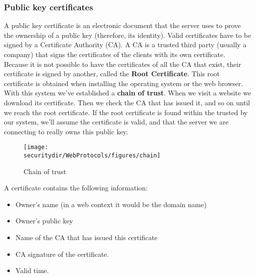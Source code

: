 \subsubsection{Public key certificates}
A public key certificate is an electronic document that the server uses to prove the ownership of a public key (therefore, its identity). Valid certificates have to be signed by a Certificate Authority (CA). A CA is a trusted third party (usually a company) that signs the certificates of the clients with its own certificate. Because it is not possible to have the certificates of all the CA that exist, their certificate is signed by another, called the \textbf{Root Certificate}. This root certificate is obtained when installing the operating system or the web browser. With this system we've established a \textbf{chain of trust}. When we visit a website we download its certificate. Then we check the CA that has issued it, and so on until we reach the root certificate. If the root certificate is found within the trusted by our system, we'll assume the certificate is valid, and that the server we are connecting to really owns this public key. 

\begin{figure}[htb]
	\begin{centering}
		\texttt{[image: \\securitydir/WebProtocols/figures/chain]}
		\par
	\end{centering}
	\caption{\label{fig:chain} Chain of trust}
\end{figure}

A certificate contains the following information:
\begin{itemize}
	\item Owner's name (in a web context it would be the domain name)
	\item Owner's public key
	\item Name of the CA that has issued this certificate
	\item CA signature of the certificate.
	\item Valid time.
\end{itemize}


